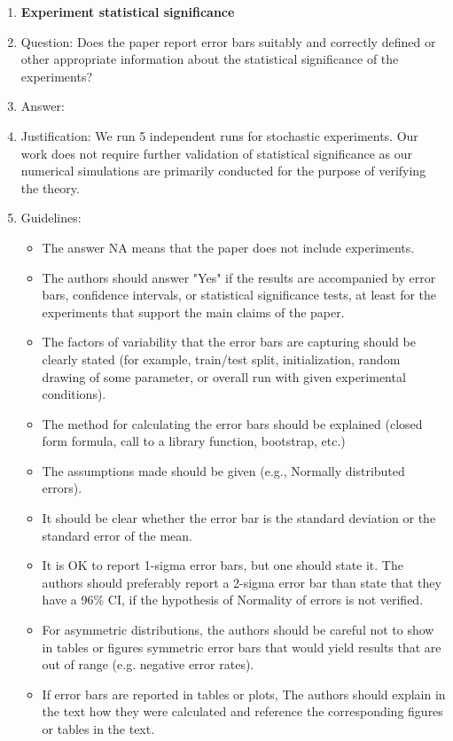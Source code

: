 \documentclass{article}
\theoremstyle{plain}
\theoremstyle{remark}
\begin{document}
\begin{enumerate}
\item {\bf Experiment statistical significance}
    \item[] Question: Does the paper report error bars suitably and correctly defined or other appropriate information about the statistical significance of the experiments?
    \item[] Answer: \answerYes{} %
    \item[] Justification: We run 5 independent runs for stochastic experiments.
    Our work does not require further validation of statistical significance as our numerical simulations are primarily conducted for the purpose of verifying the theory.
    \item[] Guidelines:
    \begin{itemize}
        \item The answer NA means that the paper does not include experiments.
        \item The authors should answer "Yes" if the results are accompanied by error bars, confidence intervals, or statistical significance tests, at least for the experiments that support the main claims of the paper.
        \item The factors of variability that the error bars are capturing should be clearly stated (for example, train/test split, initialization, random drawing of some parameter, or overall run with given experimental conditions).
        \item The method for calculating the error bars should be explained (closed form formula, call to a library function, bootstrap, etc.)
        \item The assumptions made should be given (e.g., Normally distributed errors).
        \item It should be clear whether the error bar is the standard deviation or the standard error of the mean.
        \item It is OK to report 1-sigma error bars, but one should state it. The authors should preferably report a 2-sigma error bar than state that they have a 96\% CI, if the hypothesis of Normality of errors is not verified.
        \item For asymmetric distributions, the authors should be careful not to show in tables or figures symmetric error bars that would yield results that are out of range (e.g. negative error rates).
        \item If error bars are reported in tables or plots, The authors should explain in the text how they were calculated and reference the corresponding figures or tables in the text.
    \end{itemize}


\end{enumerate}
\end{document}
